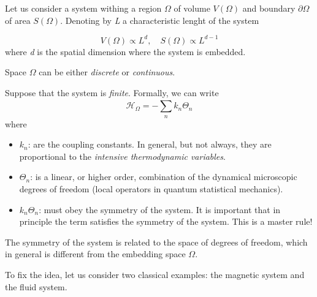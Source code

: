 \documentclass[../../Main/Main.tex]{subfiles}
\begin{document}
Let us consider a system withing a region \( \Omega  \) of volume \( V(\Omega ) \) and boundary \( \partial{\Omega }  \)    of area \( S (\Omega ) \). Denoting by \emph{L} a characteristic lenght of the system

\begin{equation*}
  V(\Omega ) \propto L^d, \quad S(\Omega  ) \propto L^{d-1}
\end{equation*}
where \emph{d} is the spatial dimension where the system is embedded.
\begin{remark}
Space \( \Omega  \) can be either \emph{discrete} or \emph{continuous}.
\end{remark}
Suppose that the system is \emph{finite}. Formally, we can write
\begin{equation}
  \mathcal{H}_{\Omega } = - \sum_{n}^{} k_n \Theta _n
\end{equation}
where
\begin{itemize}
  \item \( k_n \): are the coupling constants. In general, but not always, they are proportional to the  \emph{intensive thermodynamic variables}.
  \item \( \Theta _n \): is a linear, or higher order, combination of the dynamical microscopic degrees of freedom (local operators in quantum statistical mechanics).
  \item \( k_n \Theta _n \): must obey the symmetry of the system. It is important that in principle the term satisfies the symmetry of the system. This is a master rule!
\end{itemize}

\begin{remark}
The symmetry of the system is related to the space of degrees of freedom, which in general is different from the embedding space \( \Omega  \).
\end{remark}

To fix the idea, let us consider two classical examples: the magnetic system and the fluid system.
\end{document}
